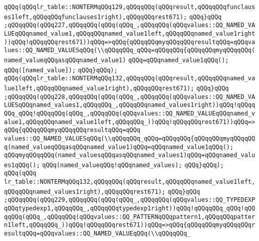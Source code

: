 \verb|qQQq(qQQqlr_table::NONTERMqQQq129,qQQqqQQq(qQQqresult,qQQqqQQqfunclauses1left,qQQqqQQqfunclauses1right),qQQqqQQqrest671);|\newline
\verb|qQQq}qQQq|\newline
\verb|;qQQqqQQq(qQQq227,qQQqqQQq(qQQq(qQQq_,qQQqqQQq(qQQqvalues::QQ_NAMED_VALUEqQQqnamed_value1,qQQqqQQqnamed_value1left,qQQqqQQqnamed_value1right))qQQq!qQQqqQQqrest671))qQQq=>qQQq{qQQqqQQqmyqQQqqQQqresultqQQq=qQQqvalues::QQ_NAMED_VALUESqQQq(\\qQQqqQQq_qQQq=qQQqqQQq{qQQqqQQqmyqQQqqQQq(named_valueqQQqasqQQqnamed_value1)|\newline
\verb|qQQq=qQQqnamed_value1qQQq();|\newline
\verb|qQQq([named_value]);|\newline
\verb|qQQq}qQQq);|\newline
\verb|qQQq(qQQqlr_table::NONTERMqQQq132,qQQqqQQq(qQQqresult,qQQqqQQqnamed_value1left,qQQqqQQqnamed_value1right),qQQqqQQqrest671);|\newline
\verb|qQQq}qQQq|\newline
\verb|;qQQqqQQq(qQQq228,qQQqqQQq(qQQq(qQQq_,qQQqqQQq(qQQqvalues::QQ_NAMED_VALUESqQQqnamed_values1,qQQqqQQq_,qQQqqQQqnamed_values1right))qQQq!qQQqqQQq_qQQq!qQQqqQQq(qQQq_,qQQqqQQq(qQQqvalues::QQ_NAMED_VALUEqQQqnamed_value1,qQQqqQQqnamed_value1left,qQQqqQQq_))qQQq!qQQqqQQqrest671))qQQq=>qQQq{qQQqqQQqmyqQQqqQQqresultqQQq=qQQq|\newline
\verb|values::QQ_NAMED_VALUESqQQq(\\qQQqqQQq_qQQq=qQQqqQQq{qQQqqQQqmyqQQqqQQq(named_valueqQQqasqQQqnamed_value1)qQQq=qQQqnamed_value1qQQq();|\newline
\verb|qQQqmyqQQqqQQq(named_valuesqQQqasqQQqnamed_values1)qQQq=qQQqnamed_values1qQQq();|\newline
\verb|qQQq(named_valueqQQq!qQQqnamed_values);|\newline
\verb|qQQq}qQQq);|\newline
\verb|qQQq(qQQq|\newline
\verb|lr_table::NONTERMqQQq132,qQQqqQQq(qQQqresult,qQQqqQQqnamed_value1left,qQQqqQQqnamed_values1right),qQQqqQQqrest671);|\newline
\verb|qQQq}qQQq|\newline
\verb|;qQQqqQQq(qQQq229,qQQqqQQq(qQQq(qQQq_,qQQqqQQq(qQQqvalues::QQ_TYPEDEXPqQQqtypedexp1,qQQqqQQq_,qQQqqQQqtypedexp1right))qQQq!qQQqqQQq_qQQq!qQQqqQQq(qQQq_,qQQqqQQq(qQQqvalues::QQ_PATTERNqQQqpattern1,qQQqqQQqpattern1left,qQQqqQQq_))qQQq!qQQqqQQqrest671))qQQq=>qQQq{qQQqqQQqmyqQQqqQQqresultqQQq=qQQqvalues::QQ_NAMED_VALUEqQQq(\\qQQqqQQq_|\newline
